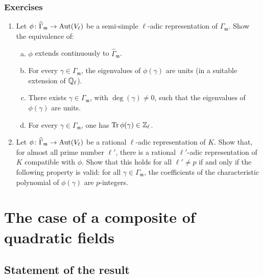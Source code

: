 \subsubsection*{Exercises}
\begin{enumerate}[1)]
\item Let $\phi\colon \widehat{\Gamma}_{\mathfrak{m}} \to \operatorname{Aut}(V_\ell)$ be a
	semi-simple $\ell$-adic representation of $\Gamma_{\mathfrak{m}}$. Show
	the equivalence of:
	\begin{enumerate}[(a)]
	\item $\phi$ extends continuously to $\widehat{\Gamma}_{\mathfrak{m}}$.
	\item For every $\gamma \in \Gamma_{\mathfrak{m}}$, the eigenvalues of
		$\phi(\gamma)$ are units (in a suitable extension of
		$\mathbb{Q}_\ell$).
	\item There exists $\gamma \in \Gamma_{\mathfrak{m}}$, with
		$\deg(\gamma) \ne 0$, such that the eigenvalues of
		$\phi(\gamma)$ are units.
	\item For every $\gamma \in \Gamma_{\mathfrak{m}}$, one has
		$\operatorname{Tr}\phi(\gamma) \in \mathbb{Z}_\ell$.
	\end{enumerate}

\item Let $\phi\colon \widehat{\Gamma}_{\mathfrak{m}} \to \operatorname{Aut}(V_\ell)$ be a
	rational $\ell$-adic representation of $K$.  Show that, for almost all
	prime number $\ell'$, there is a rational $\ell'$-adic representation
	of $K$ compatible with $\phi$. Show that this holds for all $\ell' \ne
	p$ if and only if the following property is valid: for all $\gamma \in
	\Gamma_{\mathfrak{m}}$, the coefficients of the characteristic
	polynomial of $\phi(\gamma)$ are $p$-integers.
\end{enumerate}

\section{The case of a composite of quadratic fields}
\dpage
\subsection{Statement of the result}
\label{sec:III_31}

